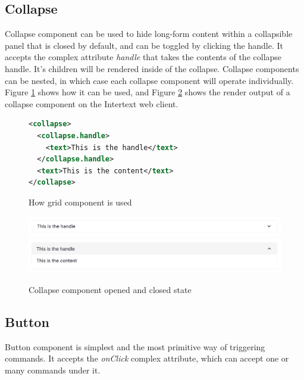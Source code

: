 \subsection{Collapse}

Collapse component can be used to hide long-form content within a collapsible panel that is closed by default, and can be toggled by clicking the handle. It accepts the complex attribute \textit{handle} that takes the contents of the collapse handle. It's children will be rendered inside of the collapse. Collapse components can be nested, in which case each collapse component will operate individually. Figure \ref{fig:collapse_xml} shows how it can be used, and Figure \ref{fig:collapse} shows the render output of a collapse component on the Intertext web client.

\begin{figure}
\begin{minipage}{\linewidth}
\begin{lstlisting}[language=xml]
<collapse>
  <collapse.handle>
    <text>This is the handle</text>
  </collapse.handle>
  <text>This is the content</text>
</collapse>
\end{lstlisting}
\end{minipage}
\caption{How grid component is used}%
\label{fig:collapse_xml}%
\end{figure}

\begin{figure}
  \centering
  \includegraphics[width=13cm]{thesis/paper/images/collapse_closed.png}
  \includegraphics[width=13cm]{thesis/paper/images/collapse_open.png}
  \caption{Collapse component opened and closed state}%
  \label{fig:collapse}%
\end{figure}

\subsection{Button}

Button component is simplest and the most primitive way of triggering commands. It accepts the \textit{onClick} complex attribute, which can accept one or many commands under it.

